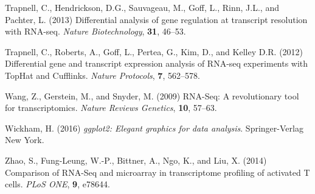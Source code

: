 \documentclass{bioinfo}
\begin{document}
\begin{thebibliography}{}
Trapnell, C., Hendrickson, D.G., Sauvageau, M., Goff, L., Rinn, J.L., and Pachter, L. (2013) Differential analysis of gene regulation at transcript resolution with RNA-seq. {\it Nature Biotechnology}, {\bf 31}, 46--53.

Trapnell, C., Roberts, A., Goff, L., Pertea, G., Kim, D., and Kelley D.R. (2012) Differential gene and transcript expression analysis of RNA-seq experiments with TopHat and Cufflinks. {\it Nature Protocols}, {\bf 7}, 562--578.

Wang, Z., Gerstein, M., and Snyder, M. (2009) RNA-Seq: A revolutionary tool for transcriptomics. {\it Nature Reviews Genetics}, {\bf 10}, 57--63.

Wickham, H. (2016) {\it ggplot2: Elegant graphics for data analysis}. Springer-Verlag New York.

Zhao, S., Fung-Leung, W.-P., Bittner, A., Ngo, K., and Liu, X. (2014) Comparison of RNA-Seq and microarray in transcriptome profiling of activated T cells. {\it PLoS ONE}, {\bf 9}, e78644.
\end{thebibliography}
\end{document}
